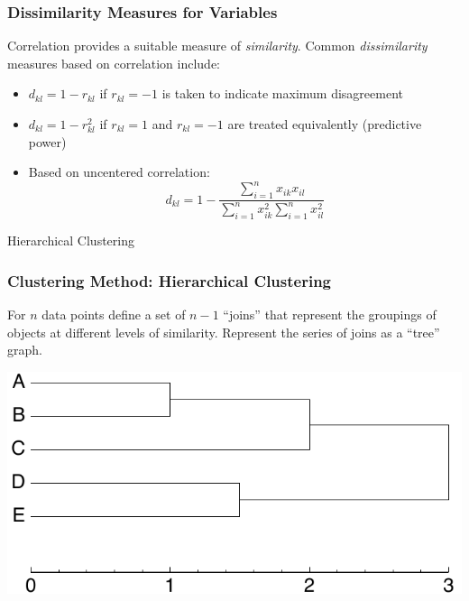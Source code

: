 \documentclass{beamer}
\begin{document}
\begin{frame}
  \frametitle{Dissimilarity Measures for Variables}

Correlation provides a suitable measure of \emph{similarity}. 
Common \emph{dissimilarity} measures based on correlation include:


\begin{itemize}

\item $d_{kl} = 1 - r_{kl}$ if $r_{kl} = -1$ is taken to indicate maximum disagreement

\item $d_{kl} = 1 - r_{kl}^2$ if $r_{kl} = 1$ and $r_{kl} = -1$ are treated equivalently (predictive power)


\item Based on uncentered correlation:
\[
d_{kl} = 1 - \frac{\sum_{i=1}^n x_{ik}x_{il}} {\sum_{i=1}^n x_{ik}^2 \sum_{i=1}^n x_{il}^2}
\]

\end{itemize}
\end{frame}


\begin{frame}[plain,c]
\begin{center}
\Huge Hierarchical Clustering
\end{center}
\end{frame}


\begin{frame}[fragile]
  \frametitle{Clustering Method: Hierarchical Clustering}

For $n$ data points define a set of $n-1$ ``joins'' that represent
the groupings of objects at different levels of similarity. Represent
the series of joins as a ``tree'' graph.

\smallskip

\begin{center}
\includegraphics[width=0.75\linewidth]{fig-dendro.pdf}
\end{center}


\end{frame}
\end{document}
